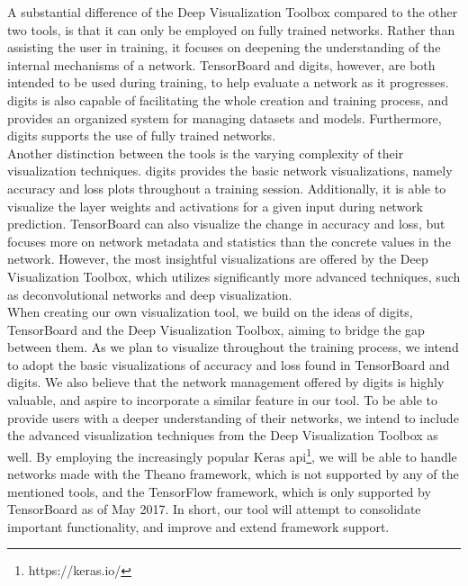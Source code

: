 \noindent A substantial difference of the Deep Visualization Toolbox compared to the other two tools, is that it can only be employed on fully trained networks. Rather than assisting the user in training, it focuses on deepening the understanding of the internal mechanisms of a network. TensorBoard and \acrshort{digits}, however, are both intended to be used during training, to help evaluate a network as it progresses. \acrshort{digits} is also capable of facilitating the whole creation and training process, and provides an organized system for managing datasets and models. Furthermore, \acrshort{digits} supports the use of fully trained networks. \\

\noindent Another distinction between the tools is the varying complexity of their visualization techniques. \acrshort{digits} provides the basic network visualizations, namely accuracy and loss plots throughout a training session. Additionally, it is able to visualize the layer weights and activations for a given input during network prediction. TensorBoard can also visualize the change in accuracy and loss, but focuses more on network metadata and statistics than the concrete values in the network. However, the most insightful visualizations are offered by the Deep Visualization Toolbox, which utilizes significantly more advanced techniques, such as deconvolutional networks and deep visualization. \\

\noindent When creating our own visualization tool, we build on the ideas of \acrshort{digits}, TensorBoard and the Deep Visualization Toolbox, aiming to bridge the gap between them. As we plan to visualize throughout the training process, we intend to adopt the basic visualizations of accuracy and loss found in TensorBoard and \acrshort{digits}. We also believe that the network management offered by \acrshort{digits} is highly valuable, and aspire to incorporate a similar feature in our tool. To be able to provide users with a deeper understanding of their networks, we intend to include the advanced visualization techniques from the Deep Visualization Toolbox as well. By employing the increasingly popular Keras \acrshort{api}\footnote{https://keras.io/}, we will be able to handle networks made with the Theano framework, which is not supported by any of the mentioned tools, and the TensorFlow framework, which is only supported by TensorBoard as of May 2017. In short, our tool will attempt to consolidate important functionality, and improve and extend framework support.


